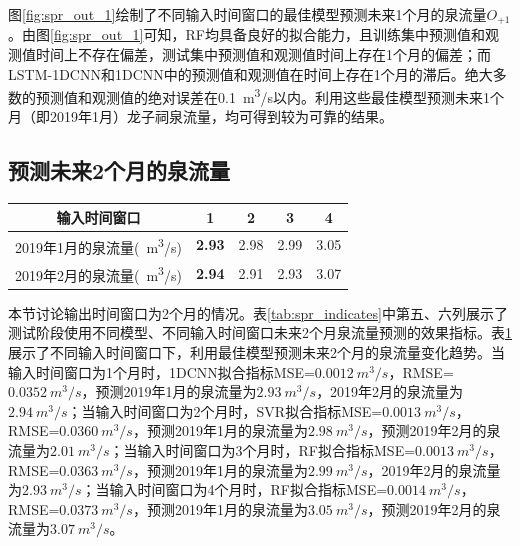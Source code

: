 图\ref{fig:spr_out_1}绘制了不同输入时间窗口的最佳模型预测未来1个月的泉流量$O_{+1}$。由图\ref{fig:spr_out_1}可知，RF均具备良好的拟合能力，且训练集中预测值和观测值时间上不存在偏差，测试集中预测值和观测值时间上存在1个月的偏差；而LSTM-1DCNN和1DCNN中的预测值和观测值在时间上存在1个月的滞后。绝大多数的预测值和观测值的绝对误差在\SI{0.1}{m^{3}/s}以内。利用这些最佳模型预测未来1个月（即2019年1月）龙子祠泉流量，均可得到较为可靠的结果。

\subsection{预测未来2个月的泉流量}\label{sec:spr_two}

\begin{table}[!htbp]
  \centering
  \label{tab:spr_two}
  \footnotesize
  \begin{tabular}{ccccc}
    \toprule
    输入时间窗口 & 1 & 2 & 3 & 4\\
    \midrule
    2019年1月的泉流量(\SI{}{m^{3}/s})& \textbf{2.93} & 2.98 & 2.99 & 3.05 \\
      2019年2月的泉流量(\SI{}{m^{3}/s})& \textbf{2.94} & 2.91 & 2.93 & 3.07 \\
    \bottomrule
  \end{tabular}
\end{table}

本节讨论输出时间窗口为2个月的情况。表\ref{tab:spr_indicates}中第五、六列展示了测试阶段使用不同模型、不同输入时间窗口未来2个月泉流量预测的效果指标。表\ref{tab:spr_two}展示了不同输入时间窗口下，利用最佳模型预测未来2个月的泉流量变化趋势。当输入时间窗口为1个月时，1DCNN拟合指标MSE=$\SI{0.0012}{m^{3}/s}$，RMSE=$\SI{0.0352}{m^{3}/s}$，预测2019年1月的泉流量为$\SI{2.93}{m^{3}/s}$，2019年2月的泉流量为$\SI{2.94}{m^{3}/s}$；当输入时间窗口为2个月时，SVR拟合指标MSE=$\SI{0.0013}{m^{3}/s}$，RMSE=$\SI{0.0360}{m^{3}/s}$，预测2019年1月的泉流量为$\SI{2.98}{m^{3}/s}$，预测2019年2月的泉流量为$\SI{2.01}{m^{3}/s}$；当输入时间窗口为3个月时，RF拟合指标MSE=$\SI{0.0013}{m^{3}/s}$，RMSE=$\SI{0.0363}{m^{3}/s}$，预测2019年1月的泉流量为$\SI{2.99}{m^{3}/s}$，2019年2月的泉流量为$\SI{2.93}{m^{3}/s}$；当输入时间窗口为4个月时，RF拟合指标MSE=$\SI{0.0014}{m^{3}/s}$，RMSE=$\SI{0.0373}{m^{3}/s}$，预测2019年1月的泉流量为$\SI{3.05}{m^{3}/s}$，预测2019年2月的泉流量为$\SI{3.07}{m^{3}/s}$。

